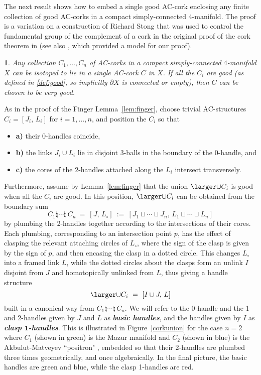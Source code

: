 \documentclass[11pt]{amsart}
\newcommand{\thistheoremname}{}
\newtheorem{genericthm}[theorem]{\thistheoremname}
\newenvironment{namedtheorem}[1]
  {\renewcommand{\thistheoremname}{#1}%
   \begin{genericthm}}
  {\end{genericthm}}
\theoremstyle{definition}
\newcommand{\pf}{\vskip-5pt \vskip-5pt \proof}
\newcommand{\figref}[1]{Figure~\ref{#1}}
\newcommand{\lemref}[1]{Lemma~\ref{#1}}
\newcommand{\bit}[1]{\textbf{\textit{#1}}} %
\newcommand{\del}{\partial}
\newcommand{\ac}{\textup{AC}}
\newcommand{\items}{\begin{itemize}[leftmargin=25pt,rightmargin=5pt]
  \setlength\itemsep{2pt}}
\newcommand{\stopitems}{\end{itemize}}
\begin{document}
The next result shows how to embed a single good \ac-cork enclosing any finite collection of good \ac-corks in a compact simply-connected 4-manifold.  The proof is a variation on a construction of Richard Stong \cite{stong} that was used to control the fundamental group of the complement of a cork in the original proof of the cork theorem in \cite{curtis-freedman-hsiang-stong} (see also \cite{kirby:cork}, which provided a model for our proof).  



\begin{namedtheorem}{Encasement Lemma}\label{encasement} 
Any collection $C_1, \dots, C_n$ of \ac-corks in a compact simply-connected $4$-manifold $X$ can be isotoped to lie in a single \ac-cork $C$ in $X$.  If all the $C_i$ are good \textup{(as defined in \ref{def:good}, so implicitly $\del X$ is connected or empty)}, then $C$ can be chosen to be very good.
\end{namedtheorem}  

\pf
As in the proof of the Finger \lemref{lem:finger}, choose trivial \ac-structures $C_i = [J_i,\,L_i]$ for $i=1,\dots,n$, and position the $C_i$ so that 
\items
\item[\small\bf a)]  their 0-handles coincide, 
\item[\small\bf b)] the links $J_i\cup L_i$ lie in disjoint 3-balls in the boundary of the 0-handle, and 
\item[\small\bf c)] the cores of the 2-handles attached along the $L_i$ intersect transversely.
\stopitems
Furthermore, assume by \lemref{lem:finger} that the union $\Q$ is good when all the $C_i$ are good.  In this position, $\Q$ can be obtained from the boundary sum 
$$
C_1\natural\cdots\natural \,C_n \ = \ [J,\,L_\circ] \ := \ [J_1\sqcup\cdots\sqcup J_n,\, L_1\sqcup\cdots\sqcup L_n]
$$
by plumbing the 2-handles together according to the intersections of their cores.  Each plumbing, corresponding to an intersection point $p$, has the effect of clasping the relevant attaching circles of $L_\circ$, where the sign of the clasp is given by the sign of $p$, and then encasing the clasp in a dotted circle. This changes $L_\circ$ into a framed link $L$, while the dotted circles about the clasps form an unlink $I$ disjoint from $J$ and homotopically unlinked from $L$, thus giving a handle structure 
$$
\Q \ = \ [I\cup J, \,L]
$$
built in a canonical way from $C_1\natural\cdots\natural \,C_n$.  We will refer to the 0-handle and the 1 and 2-handles given by $J$ and $L$ as \bit{basic handles}, and the handles given by $I$ as \bit{clasp $\bm{1}$-handles}.  This is illustrated in \figref{corkunion} for the case $n=2$ where $C_1$ (shown in green) is the Mazur manifold and $C_2$ (shown in blue) is the Akbulut-Matveyev ``positron" \cite{akbulut-yasui:corks-plugs}, embedded so that their 2-handles are plumbed three times geometrically, and once algebraically.  In the final picture, the basic handles are green and blue, while the clasp 1-handles are red.  
\end{document}
